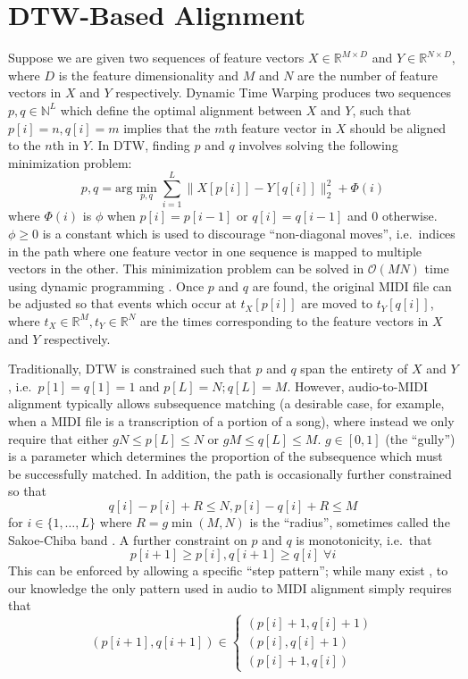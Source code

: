 \documentclass{article}
\begin{document}
\section{DTW-Based Alignment}
\label{sec:dtw}

Suppose we are given two sequences of feature vectors $X \in \mathbb{R}^{M \times D}$ and $Y \in \mathbb{R}^{N \times D}$, where $D$ is the feature dimensionality and $M$ and $N$ are the number of feature vectors in $X$ and $Y$ respectively.
Dynamic Time Warping produces two sequences $p, q \in \mathbb{N}^L$ which define the optimal alignment between $X$ and $Y$, such that $p[i] = n, q[i] = m$ implies that the $m$th feature vector in $X$ should be aligned to the $n$th in $Y$.
In DTW, finding $p$ and $q$ involves solving the following minimization problem:
$$
p, q = \mathrm{arg}\min_{p, q} \sum_{i = 1}^{L} \|X[p[i]] - Y[q[i]]\|_2^2 + \Phi(i)
$$
where $\Phi(i)$ is $\phi$ when $p[i] = p[i - 1]$ or $q[i] = q[i - 1]$ and $0$ otherwise.
$\phi \ge 0$ is a constant which is used to discourage ``non-diagonal moves'', i.e.\ indices in the path where one feature vector in one sequence is mapped to multiple vectors in the other.
This minimization problem can be solved in $\mathcal{O}(MN)$ time using dynamic programming \cite{sakoe1978dynamic}.
Once $p$ and $q$ are found, the original MIDI file can be adjusted so that events which occur at $t_X[p[i]]$ are moved to $t_Y[q[i]]$, where $t_X \in \mathbb{R}^M, t_Y \in \mathbb{R}^N$ are the times corresponding to the feature vectors in $X$ and $Y$ respectively.

Traditionally, DTW is constrained such that $p$ and $q$ span the entirety of $X$ and $Y$, i.e.\ $p[1] = q[1] = 1$ and $p[L] = N; q[L] = M$.
However, audio-to-MIDI alignment typically allows subsequence matching (a desirable case, for example, when a MIDI file is a transcription of a portion of a song), where instead we only require that either $gN \le p[L] \le N$ or $gM \le q[L] \le M$.
$g \in [0, 1]$ (the ``gully'') is a parameter which determines the proportion of the subsequence which must be successfully matched.
In addition, the path is occasionally further constrained so that
$$
q[i] - p[i] + R \le N, p[i] - q[i] + R \le M
$$
for $i \in \{1, \ldots, L\}$ where $R = g\min(M, N)$ is the ``radius'', sometimes called the Sakoe-Chiba band \cite{sakoe1978dynamic}.
A further constraint on $p$ and $q$ is monotonicity, i.e.\ that
$$
p[i + 1] \ge p[i], q[i + 1] \ge q[i] \; \forall i
$$
This can be enforced by allowing a specific ``step pattern''; while many exist \cite{muller2007dynamic, sakoe1978dynamic}, to our knowledge the only pattern used in audio to MIDI alignment simply requires that
$$
(p[i + 1], q[i + 1]) \in \begin{cases}
(p[i] + 1, q[i] + 1)\\
(p[i], q[i] + 1)\\
(p[i] + 1, q[i])
\end{cases}
$$
\end{document}
